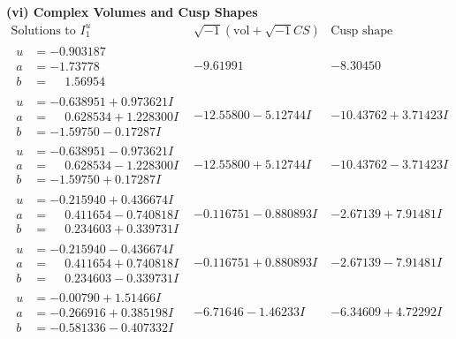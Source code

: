 \documentclass[1p]{elsarticle_modified}
\theoremstyle{definition}
\newcommand{\I}{\sqrt{-1}}
\begin{document}
\newpage\flushleft \textbf{(vi) Complex Volumes and Cusp Shapes}
$$\begin{array}{c|c|c}  
\text{Solutions to }I^u_{1}& \I (\text{vol} + \sqrt{-1}CS) & \text{Cusp shape}\\
 \hline 
\begin{aligned}
u &= -0.903187\phantom{ +0.000000I} \\
a &= -1.73778\phantom{ +0.000000I} \\
b &= \phantom{-}1.56954\phantom{ +0.000000I}\end{aligned}
 & -9.61991\phantom{ +0.000000I} & -8.30450\phantom{ +0.000000I} \\ \hline\begin{aligned}
u &= -0.638951 + 0.973621 I \\
a &= \phantom{-}0.628534 + 1.228300 I \\
b &= -1.59750 - 0.17287 I\end{aligned}
 & -12.55800 - 5.12744 I & -10.43762 + 3.71423 I \\ \hline\begin{aligned}
u &= -0.638951 - 0.973621 I \\
a &= \phantom{-}0.628534 - 1.228300 I \\
b &= -1.59750 + 0.17287 I\end{aligned}
 & -12.55800 + 5.12744 I & -10.43762 - 3.71423 I \\ \hline\begin{aligned}
u &= -0.215940 + 0.436674 I \\
a &= \phantom{-}0.411654 - 0.740818 I \\
b &= \phantom{-}0.234603 + 0.339731 I\end{aligned}
 & -0.116751 - 0.880893 I & -2.67139 + 7.91481 I \\ \hline\begin{aligned}
u &= -0.215940 - 0.436674 I \\
a &= \phantom{-}0.411654 + 0.740818 I \\
b &= \phantom{-}0.234603 - 0.339731 I\end{aligned}
 & -0.116751 + 0.880893 I & -2.67139 - 7.91481 I \\ \hline\begin{aligned}
u &= -0.00790 + 1.51466 I \\
a &= -0.266916 + 0.385198 I \\
b &= -0.581336 - 0.407332 I\end{aligned}
 & -6.71646 - 1.46233 I & -6.34609 + 4.72292 I \\ \hline\begin{aligned}

\end{aligned}
\end{array}$$
\end{document}
